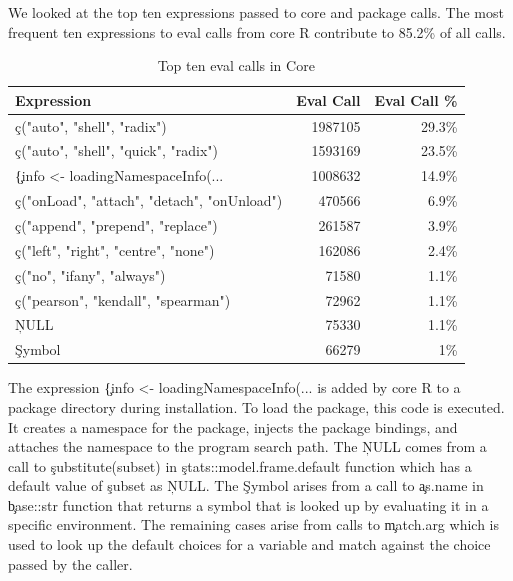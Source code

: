 \documentclass[conference]{IEEEtran}
\begin{document}
We looked at the top ten expressions passed to core and package \eval calls. The
most frequent ten expressions to eval calls from core R contribute to 85.2\% of
all \eval calls.
\begin{table}[tb]
  \centering
  \begin{tabular}{l|rr} \hline
    Expression & Eval Call & Eval Call \% \\\hline
    \c{c("auto", "shell", "radix")} & 1987105 & 29.3\%\\
    \c{c("auto", "shell", "quick", "radix")} & 1593169  & 23.5\%\\
    \c{\{info <- loadingNamespaceInfo(...} & 1008632 &       14.9\%\\
    \c{c("onLoad", "attach", "detach", "onUnload")}   & 470566 &      6.9\%\\
    \c{c("append", "prepend", "replace")} &              261587&       3.9\% \\
    \c{c("left", "right", "centre", "none")} & 162086     & 2.4\%\\
    \c{c("no", "ifany", "always")}   &                71580 &       1.1\%\\
    \c{c("pearson", "kendall", "spearman")}  & 72962 &      1.1\%\\
    \c{NULL}& 75330  &      1.1\% \\
    \c{Symbol}&                 66279&       1\%\\\hline
  \end{tabular}
  \caption{Top ten eval calls in Core}
  \label{A}
\end{table}

The expression \c{\{info <- loadingNamespaceInfo(...} is added by core R
to a package directory during installation. To load the package, this code is
executed. It creates a namespace for the package, injects the package bindings,
and attaches the namespace to the program search path. The \c{NULL} comes from a
call to \c{substitute(subset)} in \c{stats::model.frame.default} function which
has a default value of \c{subset} as \c{NULL}. The \c{Symbol} arises from a
call to \c{as.name} in \c{base::str} function that returns a symbol that is
looked up by evaluating it in a specific environment. The remaining cases arise
from calls to \c{match.arg} which is used to look up the default choices for a
variable and match against the choice passed by the caller.
\end{document}

